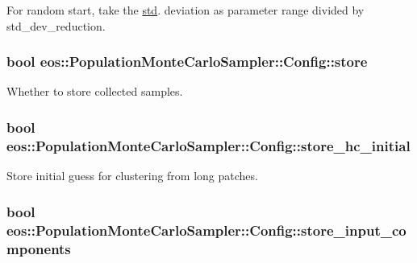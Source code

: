 For random start, take the \hyperlink{namespacestd}{std}. deviation as parameter range divided by std\_\-dev\_\-reduction. \hypertarget{structeos_1_1PopulationMonteCarloSampler_1_1Config_a3dffd8c05d907bae4e3aaaf1733d93c1}{
\subsubsection[{store}]{\setlength{\rightskip}{0pt plus 5cm}bool {\bf eos::PopulationMonteCarloSampler::Config::store}}}
\label{structeos_1_1PopulationMonteCarloSampler_1_1Config_a3dffd8c05d907bae4e3aaaf1733d93c1}


Whether to store collected samples. \hypertarget{structeos_1_1PopulationMonteCarloSampler_1_1Config_ad24a2d883fe9d2faedbcf4f861bc9d82}{
\subsubsection[{store\_\-hc\_\-initial}]{\setlength{\rightskip}{0pt plus 5cm}bool {\bf eos::PopulationMonteCarloSampler::Config::store\_\-hc\_\-initial}}}
\label{structeos_1_1PopulationMonteCarloSampler_1_1Config_ad24a2d883fe9d2faedbcf4f861bc9d82}


Store initial guess for clustering from long patches. \hypertarget{structeos_1_1PopulationMonteCarloSampler_1_1Config_a1ddf56fd57dd8dd3c4462dd1cb2800ab}{
\subsubsection[{store\_\-input\_\-components}]{\setlength{\rightskip}{0pt plus 5cm}bool {\bf eos::PopulationMonteCarloSampler::Config::store\_\-input\_\-components}}}
\label{structeos_1_1PopulationMonteCarloSampler_1_1Config_a1ddf56fd57dd8dd3c4462dd1cb2800ab}


